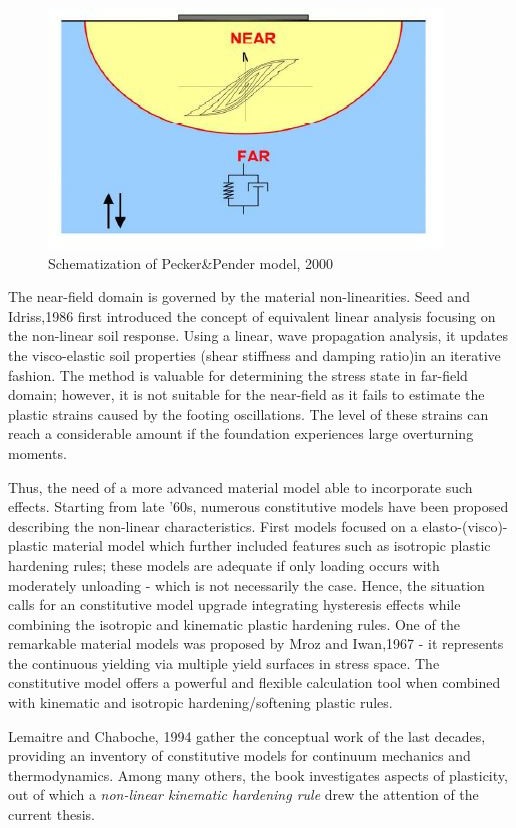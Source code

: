\documentclass[11pt,a4paper]{report}
\begin{document}
\begin{figure}[h!]
	\centering
	\includegraphics[width=0.7\linewidth]{"nearfar"}
	\caption{Schematization of Pecker\&Pender model, 2000}
	\label{near}
\end{figure}

The near-field domain is governed by the material non-linearities. Seed and Idriss,1986	\cite{seed1986use} first introduced the concept of equivalent linear analysis focusing on the non-linear soil response. Using a linear, wave propagation analysis, it updates the visco-elastic soil properties (shear stiffness and damping ratio)in an iterative fashion. The method is valuable for determining the stress state in far-field domain; however, it is not suitable for the near-field as it fails to estimate the plastic strains caused by the footing oscillations. The level of these strains can reach a considerable amount if the foundation experiences large overturning moments.

Thus, the need of a more advanced material model able to incorporate such effects. Starting from late '60s, numerous constitutive models have been proposed describing the non-linear characteristics. First models focused on a elasto-(visco)-plastic material model which further included features such as isotropic plastic hardening rules; these models are adequate if only loading occurs with moderately unloading - which is not necessarily the case. Hence, the situation calls for an constitutive model upgrade integrating hysteresis effects while combining the isotropic and kinematic plastic hardening rules. One of the remarkable material models was proposed by Mroz and Iwan,1967 \cite{mroz1967description} - it represents the continuous yielding via multiple yield surfaces in stress space. The constitutive model offers a powerful and flexible calculation tool when combined with kinematic and isotropic hardening/softening plastic rules.

Lemaitre and Chaboche, 1994 \cite{lemaitre1994mechanics} gather the conceptual work of the last decades, providing an inventory of constitutive models for continuum mechanics and thermodynamics. Among many others, the book investigates aspects of plasticity, out of which a \textit{non-linear kinematic hardening rule} drew the attention of the current thesis.
\end{document}

